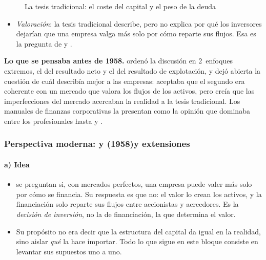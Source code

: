 \documentclass[11pt]{article}
\begin{document}
\begin{figure}[H]
\centering
\caption{La tesis tradicional: el coste del capital y el peso de la deuda}\label{fig:coste-tradicional}
\end{figure}

\begin{itemize}
\item \emph{Valoración}: la tesis tradicional describe, pero no explica por qué los inversores dejarían que una empresa valga más solo por cómo reparte sus flujos. Esa es la pregunta de  y .
\end{itemize}

\begin{anotaciones}
\textbf{Lo que se pensaba antes de 1958.} \textcite{Durand1952Costs} ordenó la discusión en 2~enfoques extremos, el del resultado neto y el del resultado de explotación, y dejó abierta la cuestión de cuál describía mejor a las empresas: aceptaba que el segundo era coherente con un mercado que valora los flujos de los activos, pero creía que las imperfecciones del mercado acercaban la realidad a la tesis tradicional. Los manuales de finanzas corporativas la presentan como la opinión que dominaba entre los profesionales hasta  y \nocite{Vernimmen2017Corporate}.
\end{anotaciones}

\subsubsection{Perspectiva moderna:  y  (1958)\newline y extensiones}\label{sec:mm}

\paragraph{a) Idea}

\begin{itemize}
\item \textcite{ModiglianiMiller1958Cost} se preguntan si, con mercados perfectos, una empresa puede valer más solo por cómo se financia. Su respuesta es que no: el valor lo crean los activos, y la financiación solo reparte sus flujos entre accionistas y acreedores. Es la \emph{decisión de inversión}, no la de financiación, la que determina el valor.
\item Su propósito no era decir que la estructura del capital da igual en la realidad, sino aislar \emph{qué} la hace importar. Todo lo que sigue en este bloque consiste en levantar sus supuestos uno a uno.
\end{itemize}
\end{document}
